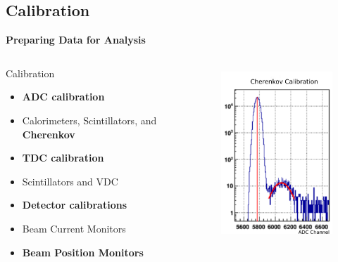 \documentclass[12pt,usenames,dvipsnames]{beamer}
\begin{document}
\subsection[Calibration]{Calibration}
\begin{frame}
\textbf{Preparing Data for Analysis}
\begin{columns}[]
\begin{block}{Calibration}
	\begin{itemize}
		\item[] \textbf{ADC calibration}
		\item Calorimeters, Scintillators, and \textbf{Cherenkov}
		\item[] \textbf{TDC calibration}
		\item Scintillators and VDC
		\item[] \textbf{Detector calibrations} 
		\item Beam Current Monitors 
		\item \textbf{Beam Position Monitors}
	\end{itemize}
\end{block}
\begin{figure}
	\vspace*{-0.25cm}
	\includegraphics[width=5cm,height=6.5cm]{../images/gc_calib.png}
\end{figure}

\end{columns}
\end{frame}
\end{document}
